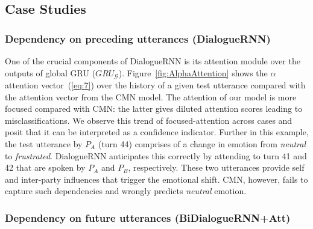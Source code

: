 \documentclass[letterpaper]{article} %
\begin{document}
\subsection{Case Studies}
\label{sec:case-study}

\subsubsection{Dependency on preceding utterances (DialogueRNN)}


One of the crucial components of DialogueRNN is its attention module over the outputs of global GRU
($GRU_{\mathcal{G}}$).  Figure~\ref{fig:AlphaAttention}  shows the $\alpha$ attention vector~(\cref{eq:7}) over
the history of a given test utterance  compared with the attention vector from the CMN model. The attention of
our model is more focused compared with CMN: the latter gives diluted attention scores leading to misclassifications.
We observe this trend of focused-attention across cases and posit that it can be interpreted as a confidence indicator. Further in this example, the test utterance by $P_A$ (turn 44) comprises of a change in emotion from \textit{neutral} to \textit{frustrated}. DialogueRNN anticipates this correctly by attending to turn 41 and 42 that are spoken by $P_A$ and $P_B$, respectively. These two utterances provide self and inter-party influences that trigger the emotional shift. CMN, however, fails to capture such dependencies and wrongly predicts \textit{neutral} emotion.



\subsubsection{Dependency on future utterances (BiDialogueRNN+Att)}
\end{document}
